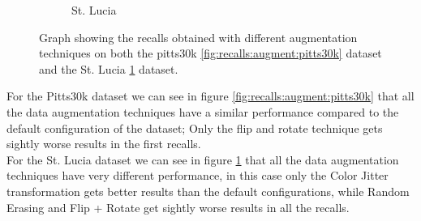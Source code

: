 \documentclass[10pt,twocolumn,letterpaper]{article}
\begin{document}
\begin{figure}
\begin{subfigure}[b]{0.23\textwidth}
      \caption{St. Lucia}
      \label{fig:recalls:augment:st_lucia}
   \end{subfigure}
   \caption{Graph showing the recalls obtained with different augmentation techniques on both the pitts30k \ref{fig:recalls:augment:pitts30k} dataset and the St. Lucia \ref{fig:recalls:augment:st_lucia} dataset.}
   \label{fig:recalls:augment}
\end{figure}
For the Pitts30k dataset we can see in figure \ref{fig:recalls:augment:pitts30k} that all the data augmentation techniques have a similar performance compared to the default configuration of the dataset; Only the flip and rotate technique gets sightly worse results in the first recalls.\\
For the St. Lucia dataset we can see in figure \ref{fig:recalls:augment:st_lucia} that all the data augmentation techniques have very different performance, in this case only the Color Jitter transformation gets better results than the default configurations, while  Random Erasing and Flip + Rotate get sightly worse results in all the recalls.
\end{document}
